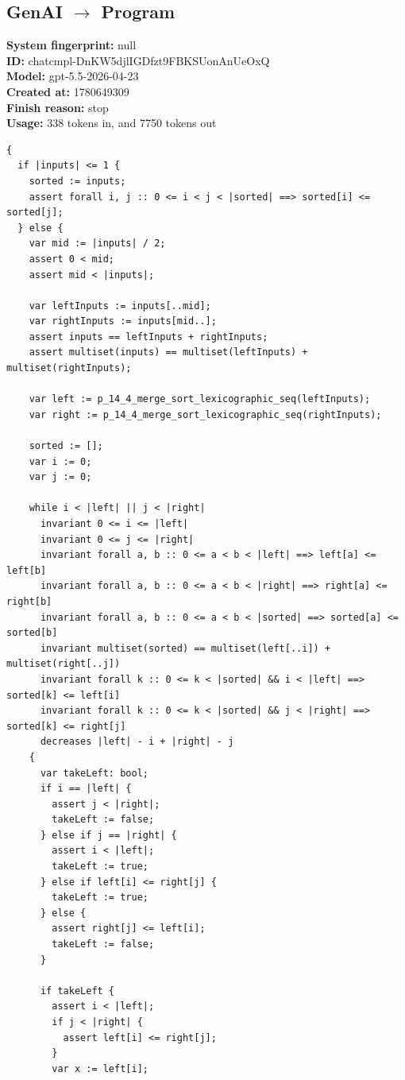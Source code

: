 \documentclass{article}
\begin{document}
\subsection*{GenAI $\rightarrow$ Program}
\textbf{System fingerprint: }null
\\\textbf{ID: }chatcmpl-DnKW5djlIGDfzt9FBKSUonAnUeOxQ
\\\textbf{Model: }gpt-5.5-2026-04-23
\\\textbf{Created at: }1780649309
\\\textbf{Finish reason: }stop
\\\textbf{Usage: }338 tokens in, and 7750 tokens out
\begin{lstlisting}
{
  if |inputs| <= 1 {
    sorted := inputs;
    assert forall i, j :: 0 <= i < j < |sorted| ==> sorted[i] <= sorted[j];
  } else {
    var mid := |inputs| / 2;
    assert 0 < mid;
    assert mid < |inputs|;

    var leftInputs := inputs[..mid];
    var rightInputs := inputs[mid..];
    assert inputs == leftInputs + rightInputs;
    assert multiset(inputs) == multiset(leftInputs) + multiset(rightInputs);

    var left := p_14_4_merge_sort_lexicographic_seq(leftInputs);
    var right := p_14_4_merge_sort_lexicographic_seq(rightInputs);

    sorted := [];
    var i := 0;
    var j := 0;

    while i < |left| || j < |right|
      invariant 0 <= i <= |left|
      invariant 0 <= j <= |right|
      invariant forall a, b :: 0 <= a < b < |left| ==> left[a] <= left[b]
      invariant forall a, b :: 0 <= a < b < |right| ==> right[a] <= right[b]
      invariant forall a, b :: 0 <= a < b < |sorted| ==> sorted[a] <= sorted[b]
      invariant multiset(sorted) == multiset(left[..i]) + multiset(right[..j])
      invariant forall k :: 0 <= k < |sorted| && i < |left| ==> sorted[k] <= left[i]
      invariant forall k :: 0 <= k < |sorted| && j < |right| ==> sorted[k] <= right[j]
      decreases |left| - i + |right| - j
    {
      var takeLeft: bool;
      if i == |left| {
        assert j < |right|;
        takeLeft := false;
      } else if j == |right| {
        assert i < |left|;
        takeLeft := true;
      } else if left[i] <= right[j] {
        takeLeft := true;
      } else {
        assert right[j] <= left[i];
        takeLeft := false;
      }

      if takeLeft {
        assert i < |left|;
        if j < |right| {
          assert left[i] <= right[j];
        }
        var x := left[i];


\end{lstlisting}
\end{document}
